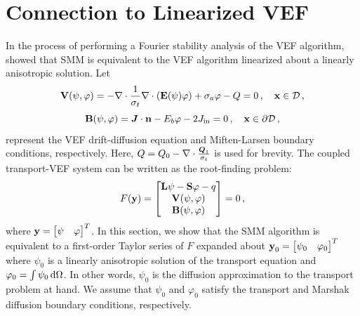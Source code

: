 \documentclass[../doc.tex]{subfiles}
\begin{document}
\section{Connection to Linearized VEF} \label{smm_sec:linearize}
In the process of performing a Fourier stability analysis of the VEF algorithm, \textcite{cefus} showed that SMM is equivalent to the VEF algorithm linearized about a linearly anisotropic solution. Let 
	\begin{equation}
		\boldsymbol{\mathrm{V}}(\psi,\varphi) = -\nabla\cdot\frac{1}{\sigma_t}\nabla\cdot\left( \boldsymbol{\mathrm{E}}(\psi)\varphi \right) + \sigma_a \varphi - Q = 0 \,, \quad \boldsymbol{\mathrm{x}} \in \mathcal{D} \,,
	\end{equation}
	\begin{equation}
		\boldsymbol{\mathrm{B}}(\psi,\varphi) = \boldsymbol{J}\cdot\boldsymbol{\mathrm{n}} - E_b \varphi - 2J_\text{in} = 0 \,, \quad \boldsymbol{\mathrm{x}} \in \partial\mathcal{D} \,,
	\end{equation}
represent the VEF drift-diffusion equation and Miften-Larsen boundary conditions, respectively. Here, $Q = Q_0 - \nabla\cdot\frac{\boldsymbol{Q}_1}{\sigma_t}$ is used for brevity. The coupled transport-VEF system can be written as the root-finding problem: 
	\begin{equation} \label{smm:vef_root}
		F(\boldsymbol{\mathrm{y}}) = \begin{bmatrix} 
			\boldsymbol{\mathrm{L}}\psi - \boldsymbol{\mathrm{S}}\varphi - q \\ 
			\boldsymbol{\mathrm{V}}(\psi,\varphi) \\ 
			\boldsymbol{\mathrm{B}}(\psi,\varphi)
		\end{bmatrix}
		= 0 \,, 
	\end{equation}
where $\boldsymbol{\mathrm{y}} = \begin{bmatrix} \psi & \varphi \end{bmatrix}^T$. In this section, we show that the SMM algorithm is equivalent to a first-order Taylor series of $F$ expanded about $\boldsymbol{\mathrm{y}}_0 = \begin{bmatrix} \psi_0 & \varphi_0 \end{bmatrix}^T$ where $\psi_0$ is a linearly anisotropic solution of the transport equation and $\varphi_0 = \int \psi_0 \mathop{}\!\mathrm{d} \Omega$. In other words, $\psi_0$ is the diffusion approximation to the transport problem at hand. We assume that $\psi_0$ and $\varphi_0$ satisfy the transport and Marshak diffusion boundary conditions, respectively. 
\end{document}
